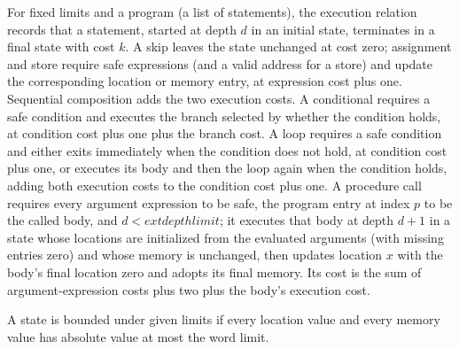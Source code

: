 \begin{definition}
\label{Light.Exec}
\leanok
{}
For fixed limits and a program (a list of statements), the execution relation records
that a statement, started at depth $d$ in an initial state, terminates in a final state
with cost $k$. A skip leaves the state unchanged at cost zero; assignment and store
require safe expressions (and a valid address for a store) and update the corresponding
location or memory entry, at expression cost plus one. Sequential composition adds the
two execution costs. A conditional requires a safe condition and executes the branch
selected by whether the condition holds, at condition cost plus one plus the branch
cost. A loop requires a safe condition and either exits immediately when the condition
does not hold, at condition cost plus one, or executes its body and then the loop again
when the condition holds, adding both execution costs to the condition cost plus one. A
procedure call requires every argument expression to be safe, the program entry at index
$p$ to be the called body, and $d < 	ext{depth limit}$; it executes that body at depth
$d+1$ in a state whose locations are initialized from the evaluated arguments (with
missing entries zero) and whose memory is unchanged, then updates location $x$ with the
body's final location zero and adopts its final memory. Its cost is the sum of
argument-expression costs plus two plus the body's execution cost.
\end{definition}

\begin{definition}
\label{Light.State.Bounded}
\leanok
{}
A state is bounded under given limits if every location value and every memory value has
absolute value at most the word limit.
\end{definition}
